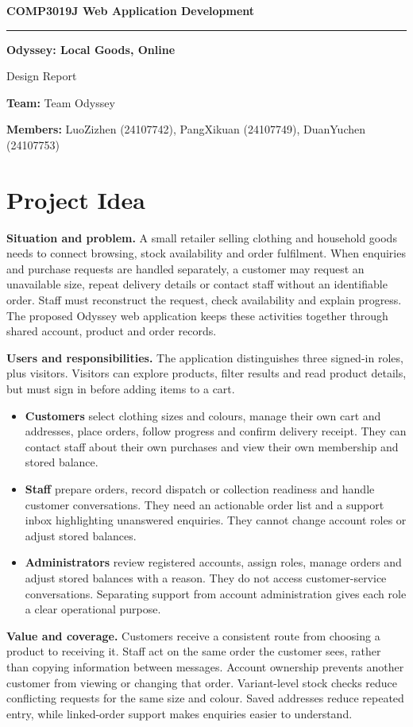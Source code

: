\documentclass[11pt,a4paper]{article}
\newcommand{\reportheader}[3]{%
\begin{center}
{\small\bfseries COMP3019J Web Application Development}\par
\vspace{2pt}\hrule\vspace{9pt}
{\LARGE\bfseries #1}\par
\vspace{2pt}Design Report
\end{center}
{\small\textbf{Team:} #2\par
\textbf{Members:} #3\par}
\vspace{3pt}}
\begin{document}
\reportheader{Odyssey: Local Goods, Online}{Team Odyssey}
{LuoZizhen (24107742), PangXikuan (24107749), DuanYuchen (24107753)}

\section{Project Idea}
\textbf{Situation and problem.} A small retailer selling clothing and household goods needs to connect browsing, stock availability and order fulfilment. When enquiries and purchase requests are handled separately, a customer may request an unavailable size, repeat delivery details or contact staff without an identifiable order. Staff must reconstruct the request, check availability and explain progress. The proposed Odyssey web application keeps these activities together through shared account, product and order records.

\textbf{Users and responsibilities.} The application distinguishes three signed-in roles, plus visitors. Visitors can explore products, filter results and read product details, but must sign in before adding items to a cart.
\begin{itemize}
\item \textbf{Customers} select clothing sizes and colours, manage their own cart and addresses, place orders, follow progress and confirm delivery receipt. They can contact staff about their own purchases and view their own membership and stored balance.
\item \textbf{Staff} prepare orders, record dispatch or collection readiness and handle customer conversations. They need an actionable order list and a support inbox highlighting unanswered enquiries. They cannot change account roles or adjust stored balances.
\item \textbf{Administrators} review registered accounts, assign roles, manage orders and adjust stored balances with a reason. They do not access customer-service conversations. Separating support from account administration gives each role a clear operational purpose.
\end{itemize}

\textbf{Value and coverage.} Customers receive a consistent route from choosing a product to receiving it. Staff act on the same order the customer sees, rather than copying information between messages. Account ownership prevents another customer from viewing or changing that order. Variant-level stock checks reduce conflicting requests for the same size and colour. Saved addresses reduce repeated entry, while linked-order support makes enquiries easier to understand.
\end{document}
